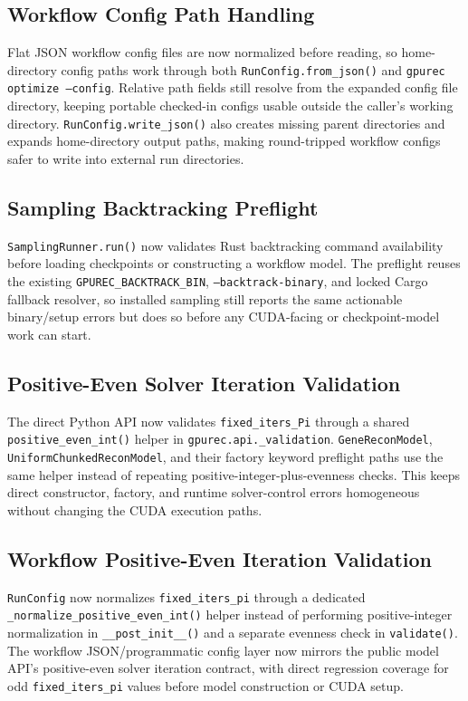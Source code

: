 \documentclass[11pt]{article}
\begin{document}
\subsection{Workflow Config Path Handling}

Flat JSON workflow config files are now normalized before reading, so
home-directory config paths work through both \texttt{RunConfig.from\_json()}
and \texttt{gpurec optimize --config}.  Relative path fields still resolve
from the expanded config file directory, keeping portable checked-in configs
usable outside the caller's working directory.  \texttt{RunConfig.write\_json()}
also creates missing parent directories and expands home-directory output
paths, making round-tripped workflow configs safer to write into external run
directories.

\subsection{Sampling Backtracking Preflight}

\texttt{SamplingRunner.run()} now validates Rust backtracking command
availability before loading checkpoints or constructing a workflow model.  The
preflight reuses the existing \texttt{GPUREC\_BACKTRACK\_BIN},
\texttt{--backtrack-binary}, and locked Cargo fallback resolver, so installed
sampling still reports the same actionable binary/setup errors but does so
before any CUDA-facing or checkpoint-model work can start.

\subsection{Positive-Even Solver Iteration Validation}

The direct Python API now validates \texttt{fixed\_iters\_Pi} through a shared
\texttt{positive\_even\_int()} helper in \texttt{gpurec.api.\_validation}.
\texttt{GeneReconModel}, \texttt{UniformChunkedReconModel}, and their factory
keyword preflight paths use the same helper instead of repeating
positive-integer-plus-evenness checks.  This keeps direct constructor,
factory, and runtime solver-control errors homogeneous without changing the
CUDA execution paths.

\subsection{Workflow Positive-Even Iteration Validation}

\texttt{RunConfig} now normalizes \texttt{fixed\_iters\_pi} through a dedicated
\texttt{\_normalize\_positive\_even\_int()} helper instead of performing
positive-integer normalization in \texttt{\_\_post\_init\_\_()} and a separate
evenness check in \texttt{validate()}.  The workflow JSON/programmatic config
layer now mirrors the public model API's positive-even solver iteration
contract, with direct regression coverage for odd \texttt{fixed\_iters\_pi}
values before model construction or CUDA setup.
\end{document}

